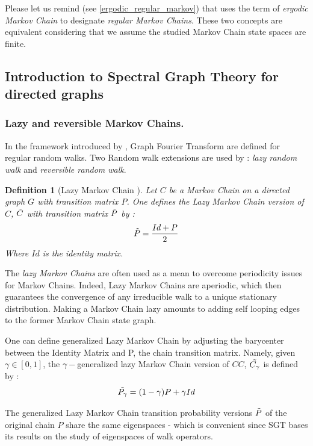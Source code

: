 \documentclass{article}
\newtheorem{definition}{Definition}[section]
\begin{document}
Please let us remind (see \ref{ergodic_regular_markov}) that \cite{sevi2019} uses the term of \textit{ergodic Markov Chain} to designate \textit{regular Markov Chains}. These two concepts are equivalent considering that we assume the studied Markov Chain state spaces are finite.

\subsection{Introduction to Spectral Graph Theory for directed graphs}

\subsubsection{Lazy and reversible Markov Chains.}
In the framework introduced by \cite{sevi2019}, Graph Fourier Transform are defined for regular random walks. Two Random walk extensions are used by \cite{sevi2019} : \textit{lazy random walk} and \textit{reversible random walk}.

\begin{definition}[Lazy Markov Chain \cite{sevi2019}]
Let $C$ be a Markov Chain on a directed graph $G$ with transition matrix $P$. One defines the Lazy Markov Chain version of $C$, $\Tilde{C}$ with transition matrix $\Tilde{P}$ by :
\begin{equation}
    \Tilde{P} = \frac{Id + P}{2}
\end{equation}
Where $Id$ is the identity matrix.

\end{definition}

The \textit{lazy Markov Chains} are often used as a mean to overcome periodicity issues for Markov Chains. Indeed, Lazy Markov Chains are aperiodic, which then guarantees the convergence of any irreducible walk to a unique stationary distribution. Making a Markov Chain lazy amounts to adding self looping edges to the former Markov Chain state graph.

One can define generalized Lazy Markov Chain by adjusting the barycenter between the Identity Matrix and P, the chain transition matrix. Namely, given $\gamma \in [0,1]$, the $\gamma-$generalized lazy Markov Chain version of $CC$, $\Tilde{C_{\gamma}}$ is defined by : 
\begin{equation}
    \Tilde{P_\gamma} = (1-\gamma) P + \gamma Id
\end{equation}

The generalized Lazy Markov Chain transition probability versions $\Tilde{P}$ of the original chain $P$ share the same eigenspaces - which is convenient since SGT bases its results on the study of eigenspaces of walk operators.
\end{document}
